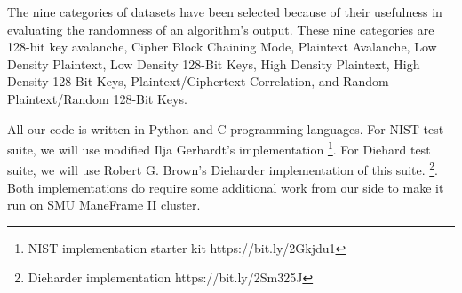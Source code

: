 \documentclass[conference]{IEEEtran}
\begin{document}
The nine categories of datasets have been selected because of their usefulness in evaluating the randomness of an algorithm's output. These nine categories are 128-bit key avalanche, Cipher Block Chaining Mode, Plaintext Avalanche, Low Density Plaintext, Low Density 128-Bit Keys, High Density Plaintext, High Density 128-Bit Keys, Plaintext/Ciphertext Correlation, and Random Plaintext/Random 128-Bit Keys.

All our code is written in Python and C programming languages. For NIST test suite, we will use modified Ilja Gerhardt's implementation \footnote{NIST implementation starter kit https://bit.ly/2Gkjdu1}. For Diehard test suite, we will use Robert G. Brown’s Dieharder implementation of this suite. \footnote{Dieharder implementation https://bit.ly/2Sm325J}. Both implementations do require some additional work from our side to make it run on SMU ManeFrame II cluster. 


\end{document}
